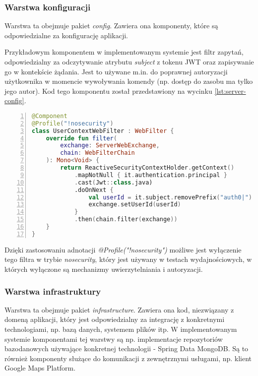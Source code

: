 \subsubsection{Warstwa konfiguracji}

Warstwa ta obejmuje pakiet \textit{config}. Zawiera ona komponenty, które są odpowiedzialne za konfigurację aplikacji.

Przykładowym komponentem w implementowanym systemie jest filtr zapytań, odpowiedzialny za odczytywanie atrybutu \textit{subject} z tokenu JWT oraz zapisywanie go w kontekście żądania. Jest to używane m.in. do poprawnej autoryzacji użytkownika w momencie wywoływania komendy (np. dostęp do zasobu ma tylko jego autor). Kod tego komponentu został przedstawiony na wycinku \ref{lst:server-config}.

\begin{lstlisting}[caption={Kod filtra zapytań},label={lst:server-config},captionpos=b,language=Kotlin,numbers=left,showstringspaces=false]
@Component
@Profile("!nosecurity")
class UserContextWebFilter : WebFilter {
    override fun filter(
        exchange: ServerWebExchange,
        chain: WebFilterChain
    ): Mono<Void> {
        return ReactiveSecurityContextHolder.getContext()
            .mapNotNull { it.authentication.principal }
            .cast(Jwt::class.java)
            .doOnNext {
                val userId = it.subject.removePrefix("auth0|")
                exchange.setUserId(userId)
            }
            .then(chain.filter(exchange))
    }
}
\end{lstlisting}

Dzięki zastosowaniu adnotacji \textit{@Profile("!nosecurity")} możliwe jest wyłączenie tego filtra w trybie \textit{nosecurity}, który jest używany w testach wydajnościowych, w których wyłączone są mechanizmy uwierzytelniania i autoryzacji.

\subsubsection{Warstwa infrastruktury}

Warstwa ta obejmuje pakiet \textit{infrastructure}. Zawiera ona kod, niezwiązany z domeną aplikacji, który jest odpowiedzialny za integrację z konkretnymi technologiami, np. bazą danych, systemem plików itp. W implementowanym systemie komponentami tej warstwy są np. implementacje repozytoriów bazodanowych używające konkretnej technologii - Spring Data MongoDB. Są to również komponenty służące do komunikacji z zewnętrznymi usługami, np. klient Google Maps Platform.

